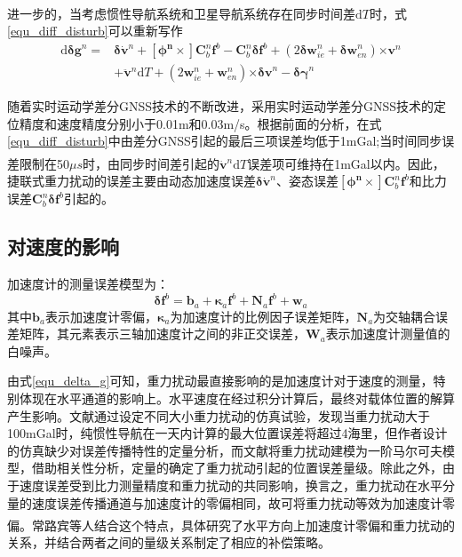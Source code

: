 \documentclass[12pt,a4,utf8]{article}
\newcommand{\upcite}[1]{\textsuperscript{\textsuperscript{\cite{#1}}}} %
\begin{document}
进一步的，当考虑惯性导航系统和卫星导航系统存在同步时间差$\text{d}T$时\upcite{schwarz1995some}，式\ref{equ_diff_disturb}可以重新写作
\begin{equation}
      \begin{aligned}
      \text{d}\bm{\delta g}^n = &\bm{\delta} \dot{\bm{v}}^n + \bm{[\phi^n\times]}\bm{C}^n_b \bm{f}^b - \bm{C}^n_b \bm{\delta f}^b + (2\bm{\delta w}^n_{ie} + \bm{\delta w}^n_{en})\bm{\times v}^n
      \\
      &+\ddot{\bm{v}}^n\text{d}T+(2\bm{w}^n_{ie} + \bm{w}^n_{en})\bm{\times \delta v}^n - \bm{\delta \gamma}^n
      \end{aligned}
      \label{equ_diff_disturb_more}
\end{equation}

随着实时运动学差分GNSS技术的不断改进，采用实时运动学差分GNSS技术的定位精度和速度精度分别小于0.01m和0.03m/s。根据前面的分析，在式\ref{equ_diff_disturb}中由差分GNSS引起的最后三项误差均低于1mGal;当时间同步误差限制在50$\mu s$时，由同步时间差引起的$\ddot{\bm{v}}^n\text{d}T$误差项可维持在1mGal以内\upcite{hao2024methods}。因此，捷联式重力扰动的误差主要由动态加速度误差$\bm{\delta} \dot{\bm{v}}^n$、姿态误差$\bm{[\phi^n\times]}\bm{C}^n_b \bm{f}^b$和比力误差$\bm{C}^n_b \bm{\delta f}^b$引起的。

\subsection{对速度的影响}
加速度计的测量误差模型为：
\begin{equation}
      \bm{\delta f}^b = \bm{b}_a + \bm{\kappa}_a \bm{f}^b + \bm{\text{N}}_a \bm{f}^b + \bm{w}_a
      \label{acc_bias}
\end{equation}
其中$\bm{b}_a$表示加速度计零偏，$\bm{\kappa}_a$为加速度计的比例因子误差矩阵，$\bm{\text{N}}_a$为交轴耦合误差矩阵，其元素表示三轴加速度计之间的非正交误差，$\bm{W}_a$表示加速度计测量值的白噪声。

由式\ref{equ_delta_g}可知，重力扰动最直接影响的是加速度计对于速度的测量，特别体现在水平通道的影响上。水平速度在经过积分计算后，最终对载体位置的解算产生影响。文献\cite{gao2021real}通过设定不同大小重力扰动的仿真试验，发现当重力扰动大于100mGal时，纯惯性导航在一天内计算的最大位置误差将超过4海里，但作者设计的仿真缺少对误差传播特性的定量分析，而文献\cite{WANGJING2016}将重力扰动建模为一阶马尔可夫模型，借助相关性分析，定量的确定了重力扰动引起的位置误差量级。除此之外，由于速度误差受到比力测量精度和重力扰动的共同影响，换言之，重力扰动在水平分量的速度误差传播通道与加速度计的零偏相同，故可将重力扰动等效为加速度计零偏。常路宾等人结合这个特点\upcite{chang2018gravity}，具体研究了水平方向上加速度计零偏和重力扰动的关系，并结合两者之间的量级关系制定了相应的补偿策略。
\end{document}
